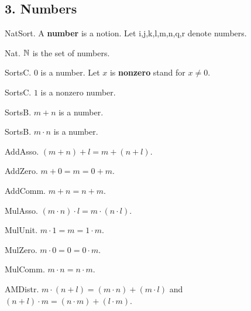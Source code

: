 \begin{axiom}
\subsection{3. Numbers}


\begin{signature} NatSort.
A {\bf number} is a notion.
Let i,j,k,l,m,n,q,r denote numbers.
\end{signature}

\begin{definition} Nat.
${\Bbb N}$ is the set of numbers.
\end{definition}

\begin{signature} SortsC.  
$0$ is a number.
Let $x$ is {\bf nonzero} stand for $x \neq 0$.
\end{signature}

\begin{signature} SortsC.
$1$ is a nonzero number.
\end{signature}

\begin{signature} SortsB.
$m + n$ is a number.
\end{signature}

\begin{signature} SortsB.
$m \cdot n$ is a number.
\end{signature}

\begin{axiom} AddAsso. $(m + n) + l = m + (n + l)$.\end{axiom}
\begin{axiom} AddZero.  $m + 0 = m = 0 + m$. \end{axiom}
\begin{axiom} AddComm.   $m + n = n + m$. \end{axiom}

\begin{axiom} MulAsso.  
$(m \cdot n) \cdot l = m \cdot (n \cdot l)$.
\end{axiom}
\begin{axiom} MulUnit.  $m \cdot 1 = m = 1 \cdot m$.\end{axiom}
\begin{axiom} MulZero.  $m \cdot 0 = 0 = 0 \cdot m$.\end{axiom}
\begin{axiom} MulComm.  $m \cdot n = n \cdot m$.\end{axiom}

\begin{axiom} AMDistr.  
$m \cdot (n + l) = (m \cdot n) + (m \cdot l)$ and
$(n + l) \cdot m = (n \cdot m) + (l \cdot m)$.\end{axiom}


\end{axiom}
